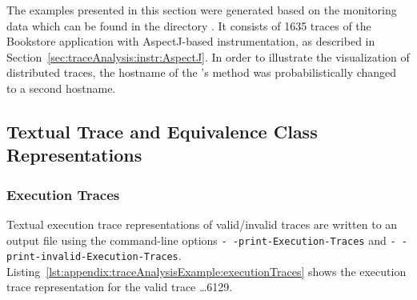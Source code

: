 \newcommand{\OPT}[1]{\texttt{#1}}
\newcommand{\OPTprintValidExecutionTraces}{-\,-print-Execution-Traces}
\newcommand{\OPTprintInvalidExecutionTraces}{-\,-print-invalid-Execution-Traces}
\newcommand{\OPTprintMessageTraces}{-\,-print-Message-Traces}
\newcommand{\OPTprintDeploymentEquivalenceClasses}{-\,-print-Deployment-Equivalence-Classes}
\newcommand{\OPTprintAssemblyEquivalenceClasses}{-\,-print-Assembly-Equivalence-Classes}
\newcommand{\OPTplotDeploymentSequenceDiagrams}{-\,-plot-Deployment-Sequence-Diagrams}
\newcommand{\OPTplotAssemblySequenceDiagrams}{-\,-plot-Assembly-Sequence-Diagrams}
\newcommand{\OPTplotCallTrees}{-\,-plotCallTrees}
\newcommand{\OPTplotAggregatedDeploymentCallTree}{-\,-plot-Aggregated-Deployment-Call-Tree}
\newcommand{\OPTplotAggregatedAssemblyCallTree}{-\,-plot-Aggregated-Assembly-Call-Tree}

\newcommand{\OPTplotContainerDependencyGraph}{-\,-plot-Container-Dependency-Graph}
\newcommand{\OPTplotDeploymentComponentDependencyGraph}{-\,-plot-Deployment-Component-Dependency-Graph}
\newcommand{\OPTplotAssemblyComponentDependencyGraph}{-\,-plot-Assembly-Component-Dependency-Graph}
\newcommand{\OPTplotDeploymentOperationDependencyGraph}{-\,-plot-Deployment-Operation-Dependency-Graph}
\newcommand{\OPTplotAssemblyOperationDependencyGraph}{-\,-plot-Assembly-Operation-Dependency-Graph}

The examples presented in this section were generated based on the %
monitoring data which can be found in the directory %
\dir{\distributedTestdataDirDistro/}. It consists of 1635 traces %
of the Bookstore application with AspectJ-based instrumentation, %
as described in Section~\ref{sec:traceAnalysis:instr:AspectJ}. %
In order to illustrate the visualization of distributed traces, %
the hostname of the 's method  was %
probabilistically changed to a second hostname.

\subsection{Textual Trace and Equivalence Class Representations}

\subsubsection{Execution Traces}\label{sec:example:executionTraces}%

Textual execution trace representations of valid/invalid traces are written to %
an output file using the command-line options \OPT{\OPTprintValidExecutionTraces} and %
\OPT{\OPTprintInvalidExecutionTraces}. %
Listing~\ref{lst:appendix:traceAnalysisExample:executionTraces} %
shows the execution trace representation for the valid trace \ldots6129.

